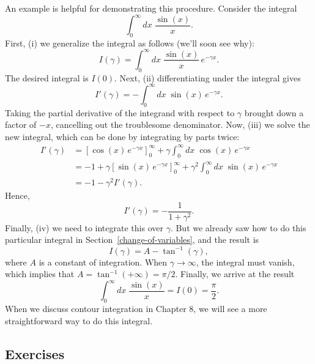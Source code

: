 \documentclass[10pt,a4paper]{article}
\begin{document}
An example is helpful for demonstrating this procedure. Consider the
integral
\begin{equation}
  \int_{0}^\infty dx \; \frac{\sin(x)}{x}.
\end{equation}
First, (i) we generalize the integral as follows (we'll soon see why):
\begin{equation}
  I(\gamma) = \int_{0}^\infty dx \; \frac{\sin(x)}{x}\, e^{-\gamma x}.
\end{equation}
The desired integral is $I(0)$. Next, (ii) differentiating under the
integral gives
\begin{equation}
  I'(\gamma) = - \int_{0}^\infty dx \; \sin(x)\, e^{-\gamma x}.
\end{equation}
Taking the partial derivative of the integrand with respect to
$\gamma$ brought down a factor of $-x$, cancelling out the troublesome
denominator. Now, (iii) we solve the new integral, which can be done
by integrating by parts twice:
\begin{align}
  I'(\gamma) &= \left[\cos(x)\,e^{-\gamma x}\right]_0^\infty + \gamma \int_{0}^\infty dx \; \cos(x)\, e^{-\gamma x} \\
  &= -1 + \gamma \left[\sin(x)\,e^{-\gamma x}\right]_0^\infty + \gamma^2 \int_{0}^\infty dx \; \sin(x)\, e^{-\gamma x} \\
  &= -1 - \gamma^2 I'(\gamma).
\end{align}
Hence,
\begin{equation}
  I'(\gamma) = - \frac{1}{1+\gamma^2}.
\end{equation}
Finally, (iv) we need to integrate this over $\gamma$. But we already
saw how to do this particular integral in
Section~\ref{change-of-variables}, and the result is
\begin{equation}
  I(\gamma) = A - \tan^{-1}(\gamma),
\end{equation}
where $A$ is a constant of integration. When
$\gamma \rightarrow \infty$, the integral must vanish, which implies
that $A = \tan^{-1}(+\infty) = \pi/2$. Finally, we arrive at the
result
\begin{equation}
  \int_{0}^\infty dx \; \frac{\sin(x)}{x} = I(0) = \frac{\pi}{2}.
\end{equation}
When we discuss contour integration in Chapter 8, we will see a more
straightforward way to do this integral.

\subsection{Exercises}
\label{exercises}
\end{document}
